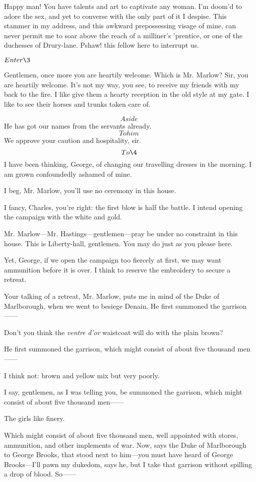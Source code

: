 \documentclass{book}
\begin{document}
\2  Happy man!  You have talents and art to captivate any woman. 
I'm doom'd to adore the sex, and yet to converse with the only part of
it I despise.  This stammer in my address, and this awkward
prepossessing visage of mine, can never permit me to soar above the
reach of a milliner's 'prentice, or one of the duchesses of Drury-lane. 
Pshaw! this fellow here to interrupt us.


\(Enter \3\)


\3  Gentlemen, once more you are heartily welcome.  Which is
Mr. Marlow?  Sir, you are heartily welcome.  It's not my way, you see,
to receive my friends with my back to the fire.  I like give them a
hearty reception in the old style at my gate.  I like to see their
horses and trunks taken care of.

\2  \[Aside\]  He has got our names from the servants already. \[To him\]
We approve your caution and hospitality, sir.  \[To \4\]  I
have been thinking, George, of changing our travelling dresses in the
morning.  I am grown confoundedly ashamed of mine.

\3  I beg, Mr. Marlow, you'll use no ceremony in this house.

\4  I fancy, Charles, you're right: the first blow is half the
battle.  I intend opening the campaign with the white and gold.

\3  Mr. Marlow---Mr. Hastings---gentlemen---pray be under no
constraint in this house.  This is Liberty-hall, gentlemen.  You may do
just as you please here.

\2  Yet, George, if we open the campaign too fiercely at first, we
may want ammunition before it is over.  I think to reserve the
embroidery to secure a retreat.

\3  Your talking of a retreat, Mr. Marlow, puts me in mind of
the Duke of Marlborough, when we went to besiege Denain.  He first
summoned the garrison------

\2  Don't you think the \textit{ventre d'or} waistcoat will do with the
plain brown?

\3  He first summoned the garrison, which might consist of
about five thousand men------

\4  I think not: brown and yellow mix but very poorly.

\3  I say, gentlemen, as I was telling you, be summoned the
garrison, which might consist of about five thousand men------

\2  The girls like finery.

\3  Which might consist of about five thousand men, well
appointed with stores, ammunition, and other implements of war.  Now,
says the Duke of Marlborough to George Brooks, that stood next to
him---you must have heard of George Brooks---I'll pawn my dukedom, says
he, but I take that garrison without spilling a drop of blood.  So------
\end{document}
